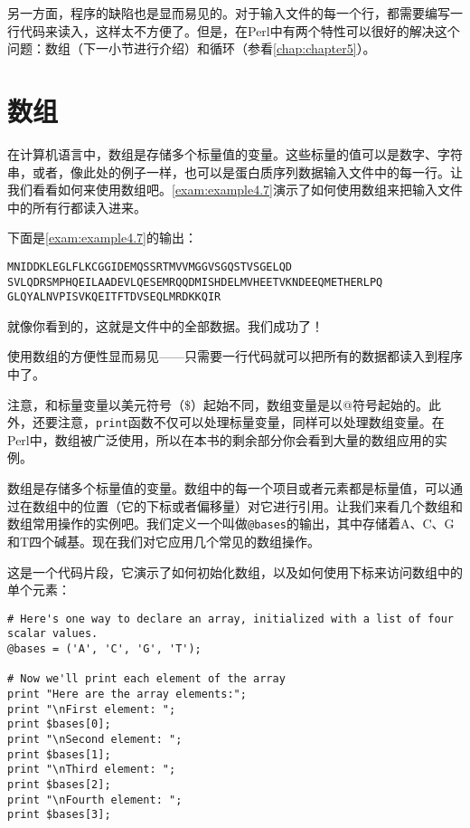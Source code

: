 另一方面，程序的缺陷也是显而易见的。对于输入文件的每一个行，都需要编写一行代码来读入，这样太不方便了。但是，在Perl中有两个特性可以很好的解决这个问题：数组（下一小节进行介绍）和循环（参看\autoref{chap:chapter5}）。

\section{数组}
在计算机语言中，数组是存储多个标量值的变量。这些标量的值可以是数字、字符串，或者，像此处的例子一样，也可以是蛋白质序列数据输入文件中的每一行。让我们看看如何来使用数组吧。\autoref{exam:example4.7}演示了如何使用数组来把输入文件中的所有行都读入进来。



下面是\autoref{exam:example4.7}的输出：

\begin{lstlisting}
MNIDDKLEGLFLKCGGIDEMQSSRTMVVMGGVSGQSTVSGELQD
SVLQDRSMPHQEILAADEVLQESEMRQQDMISHDELMVHEETVKNDEEQMETHERLPQ
GLQYALNVPISVKQEITFTDVSEQLMRDKKQIR
\end{lstlisting}

就像你看到的，这就是文件中的全部数据。我们成功了！

使用数组的方便性显而易见——只需要一行代码就可以把所有的数据都读入到程序中了。

注意，和标量变量以美元符号（\$）起始不同，数组变量是以@符号起始的。此外，还要注意，\verb|print|函数不仅可以处理标量变量，同样可以处理数组变量。在Perl中，数组被广泛使用，所以在本书的剩余部分你会看到大量的数组应用的实例。

数组是存储多个标量值的变量。数组中的每一个项目或者元素都是标量值，可以通过在数组中的位置（它的下标或者偏移量）对它进行引用。让我们来看几个数组和数组常用操作的实例吧。我们定义一个叫做\verb|@bases|的输出，其中存储着A、C、G和T四个碱基。现在我们对它应用几个常见的数组操作。

这是一个代码片段，它演示了如何初始化数组，以及如何使用下标来访问数组中的单个元素：

\begin{lstlisting}
# Here's one way to declare an array, initialized with a list of four scalar values.
@bases = ('A', 'C', 'G', 'T');

# Now we'll print each element of the array
print "Here are the array elements:";
print "\nFirst element: ";
print $bases[0];
print "\nSecond element: ";
print $bases[1];
print "\nThird element: ";
print $bases[2];
print "\nFourth element: ";
print $bases[3];
\end{lstlisting}


